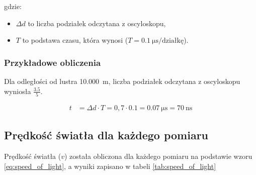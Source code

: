 \documentclass[a4paper,12pt]{article}
\begin{document}
gdzie:
\begin{itemize}
    \item $\Delta d$ to liczba podziałek odczytana z oscyloskopu,
    \item $T$ to podstawa czasu, która wynosi ($T = \SI{0.1}{\micro\second/\text{działkę}}$).
\end{itemize}

\begin{table}[h!]
    \centering
    \caption{Czas opóźnienia impulsu światła.}
    \label{tab:tabela_opóznień}
\end{table}

\subsubsection*{Przykładowe obliczenia}

Dla odległości od lustra \SI{10.000}{\meter}, liczba podziałek odczytana z oscyloskopu wyniosła $\frac{3.5}{5}$.

\begin{align*}
    t & = \Delta d \cdot T = 0{,}7 \cdot 0.1 = \SI{0.07}{\micro\second} = \SI{70}{\nano\second}
\end{align*}

\subsection{Prędkość światła dla każdego pomiaru}

Prędkość światła ($v$) została obliczona dla każdego pomiaru na podstawie wzoru \eqref{eq:speed_of_light}, a wyniki zapisano w tabeli \ref{tab:speed_of_light}
\end{document}

